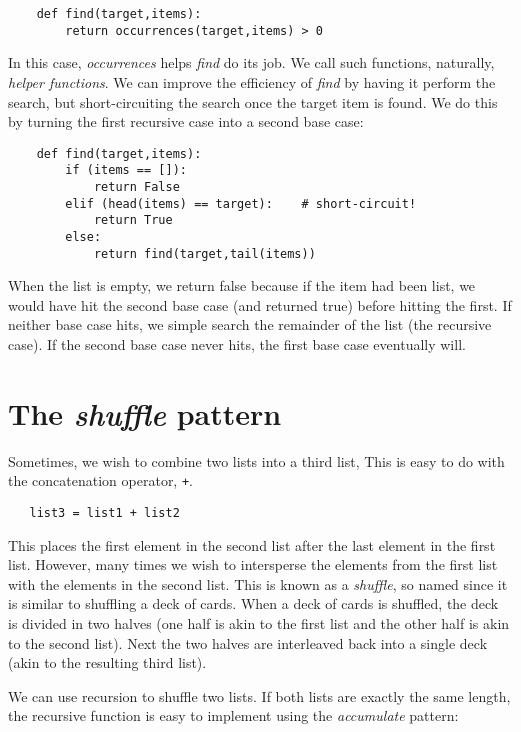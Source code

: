 \begin{verbatim}
    def find(target,items):
        return occurrences(target,items) > 0
\end{verbatim}

In this case, {\it occurrences} helps {\it find} do its job. We call
such functions, naturally, {\it helper functions}.
We can improve the efficiency of {\it find} by having it
perform the search, but short-circuiting the
search once the target item is found. We do this
by turning the first recursive case into a second base case:

\begin{verbatim}
    def find(target,items):
        if (items == []):
            return False
        elif (head(items) == target):    # short-circuit!
            return True
        else:
            return find(target,tail(items))
\end{verbatim}

When the list is empty, we return false because if
the item had been list, we would have hit the second
base case (and returned true) before hitting the first.
If neither base case hits, we simple search the remainder of
the list (the recursive case).
If the second base case never hits, the first base case 
eventually will.

\section{The {\it shuffle} pattern}

Sometimes, we wish to combine two lists into a third list,
This is easy to do with the concatenation operator, \verb!+!.

\begin{verbatim}
   list3 = list1 + list2
\end{verbatim}

This places the first element in the second list after the last
element in the first list.
However, many times we wish to intersperse the elements from the
first list with the elements in the second list. This is known
as a {\it shuffle}, so named since it is similar to shuffling a deck of
cards. When a deck of cards is shuffled,
the deck is divided in two halves (one half is akin to the first
list and the other half is akin to the second list). Next the 
two halves are interleaved back into a single deck (akin to
the resulting third list).

We can use recursion to shuffle two lists. If both lists are exactly
the same length, the recursive function is easy to implement
using the {\it accumulate} pattern:


